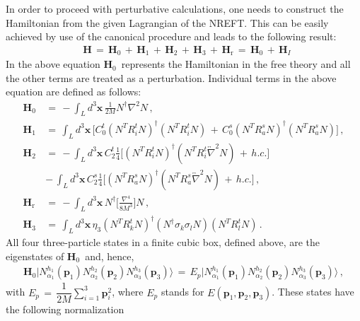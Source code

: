 \documentclass[12pt,prd,tightenlines,nofootinbib]{revtex4-2}
\begin{document}
In order to proceed with perturbative calculations, one needs to construct the
Hamiltonian from the given Lagrangian of the NREFT. This can be easily achieved by use of the canonical procedure and leads to the following result:
\begin{align}
    &\textbf{H}\, =\, \textbf{H}_{0}\,+\, \textbf{H}_{1}\, +\, \textbf{H}_{2}\, +\, \textbf{H}_{3}\, +\, \textbf{H}_{\text{r}}\, =\, \textbf{H}_{0}\,+\,  \textbf{H}_{I}\,
\end{align}
In the above equation \textbf{H}$_{0}\,$ represents the Hamiltonian in the free theory and all the other terms are treated as a perturbation. Individual terms in the above equation
are defined as follows:
\begin{align}
    \textbf{H}_{0}\, &= \, -\int_{L} d^{3}\textbf{x}\,\frac{1}{2M}N^{\dagger}\nabla^{2}N\,,\\[2mm]
    \textbf{H}_{1}\, &= \, \int_{L} d^{3}\textbf{x}\,\Big[C_{0}^{t} (N^{T}R^{t}_{i}N)^{\dagger}(N^{T}R^{t}_{i}N)\,+ \, C_{0}^{s}(N^{T}R^{s}_{a}N)^{\dagger}(N^{T}R^{s}_{a}N)\Big]\,,\\[2mm]
    \textbf{H}_{2}\, &= \,-\int_{L} d^{3}\textbf{x}\,C^{t}_{2}\frac{1}{4}\Big[ (N^{T}R^{t}_{i}N)^{\dagger} ( N^{T} R^{t}_{i}\overleftrightarrow{\nabla}^{2}N) \,+\, h.c.\Big]\nonumber\\[2mm]
    & -\, \int_{L} d^{3}\textbf{x}\,C^{s}_{2}\frac{1}{4}\Big[ (N^{T}R^{s}_{a}N)^{\dagger}( N^{T} R^{s}_{a}\overleftrightarrow{\nabla}^{2}N)\,+\, h.c.\Big]\,,\\[2mm]
    \textbf{H}_{\text{r}}\, &= \,-\int_{L} d^{3}\textbf{x}\,N^{\dagger}\Big[\frac{\nabla^{4}}{8M^3}\Big]N\,,\\[2mm]
    \textbf{H}_{3}\, &=\,\int_{L} d^{3}\textbf{x}\,\eta_{3}(N^{T}R^{t}_{k}N)^{\dagger}(N^{\dagger}\sigma_{k}\sigma_{l}N)(N^{T}R^{t}_{l}N)\,.
\end{align}
All four three-particle states in a finite cubic box, defined above, are the eigenstates of
$\textbf{H}_{0}\,$ and, hence,
\begin{align}
  \textbf{H}_{0} \big| N^{h_{1}}_{\alpha_{1}}(\textbf{p}_{1})
  N^{h_{2}}_{\alpha_{2}}(\textbf{p}_{2})N^{h_{3}}_{\alpha_{3}}(\textbf{p}_{3})\big\rangle
  \, =\, E_{p}\big| N^{h_{1}}_{\alpha_{1}}(\textbf{p}_{1})
  N^{h_{2}}_{\alpha_{2}}(\textbf{p}_{2})N^{h_{3}}_{\alpha_{3}}(\textbf{p}_{3})\big\rangle\,,
\end{align}
with $E_{p}\, = \, \dfrac{1}{2M}\sum\limits_{i=1}^{3}\textbf{p}_{i}^{2}$, where
$E_{p}$ stands for $E(\textbf{p}_{1},\textbf{p}_{2},\textbf{p}_{3})$. These states have the following normalization
\end{document}
